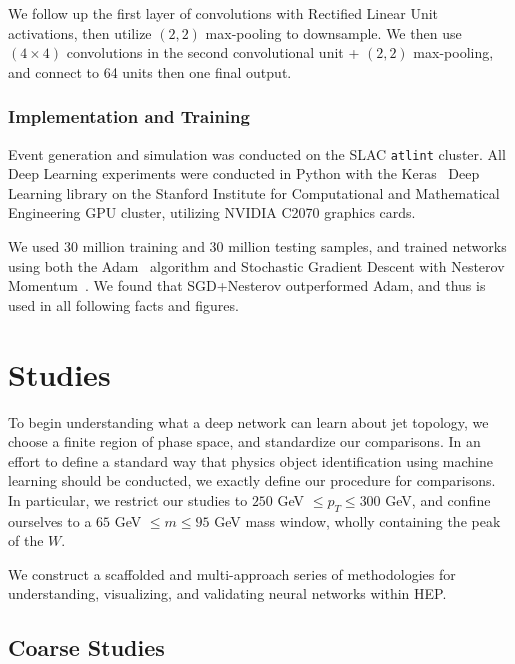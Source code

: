 \documentclass{article}
\begin{document}
We follow up the first layer of convolutions with Rectified Linear Unit activations, then utilize $(2, 2)$ max-pooling to downsample. We then use $(4\times 4)$ convolutions in the second convolutional unit + $(2, 2)$ max-pooling, and connect to 64 units then one final output.

\subsubsection{Implementation and Training} %
\label{ssub:implementation_and_training}


Event generation and simulation was conducted on the SLAC \texttt{atlint} cluster. All Deep Learning experiments were conducted in Python with the Keras~\cite{Keras} Deep Learning library on the Stanford Institute for Computational and Mathematical Engineering GPU cluster, utilizing NVIDIA C2070 graphics cards. 

We used 30 million training and 30 million testing samples, and trained networks using both the Adam~\cite{DBLP:journals/corr/KingmaB14} algorithm and Stochastic Gradient Descent with Nesterov Momentum~\cite{Nesterov:1983wy}. We found that SGD+Nesterov outperformed Adam, and thus is used in all following facts and figures.



\section{Studies} %
\label{sec:studies}

To begin understanding what a deep network can learn about jet topology, we choose a finite region of phase space, and standardize our comparisons. In an effort to define a standard way that physics object identification using machine learning should be conducted, we exactly define our procedure for comparisons. In particular, we restrict our studies to $250$ GeV $\leq p_T \leq 300$ GeV, and confine ourselves to a $65$ GeV $\leq m \leq 95$ GeV mass window, wholly containing the peak of the $W$. 

We construct a scaffolded and multi-approach series of methodologies for understanding, visualizing, and validating neural networks within HEP.

\subsection{Coarse Studies} %
\label{sub:coarse_studies}
\end{document}
